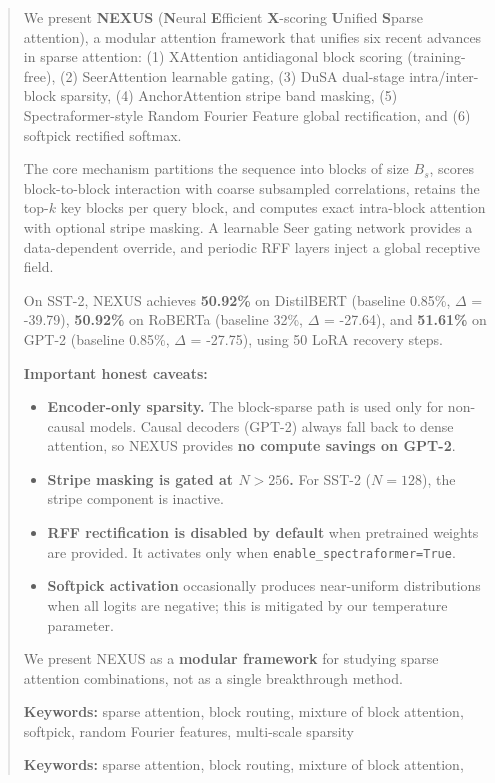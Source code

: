 \documentclass{article}
\begin{document}
\maketitle

\begin{abstract}
We present \textbf{NEXUS} (\textbf{N}eural \textbf{E}fficient \textbf{X}-scoring \textbf{U}nified \textbf{S}parse 
attention), a modular attention framework that unifies six recent advances in 
sparse attention: (1) XAttention antidiagonal block scoring (training-free), 
(2) SeerAttention learnable gating, (3) DuSA dual-stage intra/inter-block 
sparsity, (4) AnchorAttention stripe band masking, (5) Spectraformer-style 
Random Fourier Feature global rectification, and (6) softpick rectified softmax.

The core mechanism partitions the sequence into blocks of size $B_s$, scores 
block-to-block interaction with coarse subsampled correlations, retains the 
top-$k$ key blocks per query block, and computes exact intra-block attention 
with optional stripe masking. A learnable Seer gating network provides a 
data-dependent override, and periodic RFF layers inject a global receptive 
field.

On SST-2, NEXUS achieves \textbf{50.92\%} on DistilBERT (baseline 0.85\%, 
$\Delta$ = -39.79), \textbf{50.92\%} on RoBERTa (baseline 32\%, $\Delta$ = -27.64), 
and \textbf{51.61\%} on GPT-2 (baseline 0.85\%, $\Delta$ = -27.75), using 
50 LoRA recovery steps.

\textbf{Important honest caveats:}

\begin{itemize}
\item \textbf{Encoder-only sparsity.} The block-sparse path is used only for
  non-causal models. Causal decoders (GPT-2) always fall back to dense
  attention, so NEXUS provides \textbf{no compute savings on GPT-2}.
\item \textbf{Stripe masking is gated at $N > 256$.} For SST-2 ($N = 128$), the stripe
  component is inactive.
\item \textbf{RFF rectification is disabled by default} when pretrained weights are
  provided. It activates only when \texttt{enable\_spectraformer=True}.
\item \textbf{Softpick activation} occasionally produces near-uniform distributions
  when all logits are negative; this is mitigated by our temperature
  parameter.

\end{itemize}
We present NEXUS as a \textbf{modular framework} for studying sparse attention 
combinations, not as a single breakthrough method.

\textbf{Keywords:} sparse attention, block routing, mixture of block attention, 
softpick, random Fourier features, multi-scale sparsity



\vspace{0.5em}
\noindent\textbf{Keywords:} sparse attention, block routing, mixture of block attention,
\end{abstract}
\end{document}

